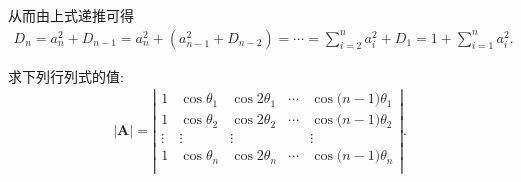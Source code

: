 \documentclass[lang=cn,newtx,10pt,scheme=chinese]{elegantbook}
\begin{document}
\begin{solution}
从而由上式递推可得
\begin{align*}
D_n=a_{n}^{2}+D_{n-1}=a_{n}^{2}+\left( a_{n-1}^{2}+D_{n-2} \right) =\cdots =\sum_{i=2}^n{a_{i}^{2}}+D_1=1+\sum_{i=1}^n{a_{i}^{2}}.
\end{align*}
\end{solution}

\begin{exercise}\label{Vandermode行列式三角函数例题}
求下列行列式的值:
\begin{align*}
|\boldsymbol{A}|=\left| \begin{matrix}
1&		\cos \theta _1&		\cos 2\theta _1&		\cdots&		\cos\mathrm{(}n-1)\theta _1\\
1&		\cos \theta _2&		\cos 2\theta _2&		\cdots&		\cos\mathrm{(}n-1)\theta _2\\
\vdots&		\vdots&		\vdots&		&		\vdots\\
1&		\cos \theta _n&		\cos 2\theta _n&		\cdots&		\cos\mathrm{(}n-1)\theta _n\\
\end{matrix} \right|.
\end{align*}
\end{exercise}
\end{document}
